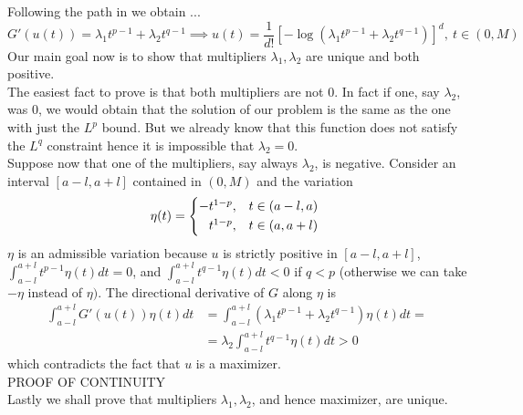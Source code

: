 \documentclass[corpo=11pt, stile=classica, tipotesi=custom,
greek, evenboxes, english]{toptesi}
\numberwithin{equation}{chapter}
\begin{document}
Following the path in \cite{nicolatilli_norm} we obtain ...\\
\begin{equation*}
	G'(u(t)) = \lambda_1 t^{p-1} + \lambda_2 t^{q-1} \implies u(t) = \dfrac{1}{d!}\left[-\log\left(\lambda_1 t^{p-1} + \lambda_2 t^{q-1}\right)\right]^d, \ t \in (0,M)
\end{equation*}
Our main goal now is to show that multipliers $\lambda_1, \lambda_2$ are unique and both positive.\\
The easiest fact to prove is that both multipliers are not 0. In fact if one, say $\lambda_2$, was 0, we would obtain that the solution of our problem is the same as the one with just the $L^p$ bound. But we already know that this function does not satisfy the $L^q$ constraint hence it is impossible that $\lambda_2=0$.\\
Suppose now that one of the multipliers, say always $\lambda_2$, is negative. Consider an interval $[a-l, a+l]$ contained in $(0,M)$ and the variation
\[ \eta(t) = \begin{cases*}
	-t^{1-p}, &  $t \in (a-l,a)$  \\
	\phantom{-}t^ {1-p}, & $t \in (a,a+l)$
\end{cases*} \]
$\eta$ is an admissible variation because $u$ is strictly positive in $[a-l, a+l]$, $\int_{a-l}^{a+l}t^{p-1}\eta(t)dt=0$, and $\int_{a-l}^{a+l}t^{q-1}\eta(t)dt <0$ if $q<p$ (otherwise we can take $-\eta$ instead of $\eta)$. The directional derivative of $G$ along $\eta$ is
\begin{align*}
	\int_{a-l}^{a+l} G'(u(t))\eta(t)dt &= \int_{a-l}^{a+l} (\lambda_1 t^{p-1} + \lambda_2 t^{q-1})\eta(t)dt = \\
									   &= \lambda_2 \int_{a-l}^{a+l} t^{q-1} \eta(t)dt > 0
\end{align*}
which contradicts the fact that $u$ is a maximizer.\\
{\Large PROOF OF CONTINUITY }\\
Lastly we shall prove that multipliers $\lambda_1, \lambda_2$, and hence maximizer, are unique.

\nocite{*}
\printbibliography


	
\end{document}
